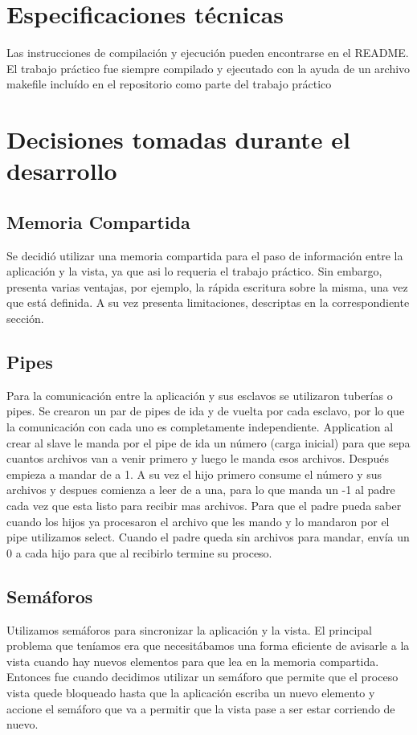 \documentclass[12pt]{article}
\begin{document}
\section{Especificaciones t\'ecnicas}

Las instrucciones de compilaci\'on y ejecuci\'on pueden encontrarse en el README. El trabajo pr\'actico fue siempre compilado y ejecutado con la ayuda de un archivo makefile inclu\'ido en el repositorio como parte del trabajo pr\'actico



\section{Decisiones tomadas durante el desarrollo}

\subsection{Memoria Compartida}
    Se decidi\'o utilizar una memoria compartida para el paso de informaci\'on entre la aplicaci\'on y la vista, ya que asi lo requeria el trabajo pr\'actico. Sin embargo, presenta varias ventajas, por ejemplo, la r\'apida escritura sobre la misma, una vez que est\'a definida. A su vez presenta limitaciones, descriptas en la correspondiente secci\'on. 

\subsection{Pipes}
	Para la comunicaci\'on entre la aplicaci\'on y sus esclavos se utilizaron tuber\'ias o pipes. Se crearon un par de pipes de ida y de vuelta por cada esclavo, por lo que la comunicaci\'on con cada uno es completamente independiente.
	Application al crear al slave le manda por el pipe de ida un n\'umero (carga inicial) para que sepa cuantos archivos van a venir primero y luego le manda esos archivos. Despu\'es empieza a mandar de a 1. A su vez el hijo primero consume el n\'umero y sus archivos y despues comienza a leer de a una, para lo que manda un -1 al padre cada vez que esta listo para recibir mas archivos.
	Para que el padre pueda saber cuando los hijos ya procesaron el archivo que les mando y lo mandaron por el pipe utilizamos select.
	Cuando el padre queda sin archivos para mandar, env\'ia un 0 a cada hijo para que al recibirlo termine su proceso.

\subsection{Sem\'aforos} 
    Utilizamos sem\'aforos para sincronizar la aplicaci\'on y la vista. El principal problema que ten\'iamos era que necesit\'abamos una forma eficiente de avisarle a la vista cuando hay nuevos elementos para que lea en la memoria compartida. Entonces fue cuando decidimos utilizar un sem\'aforo que permite que el proceso vista quede bloqueado hasta que la aplicaci\'on escriba un nuevo elemento y accione el sem\'aforo que va a permitir que la vista pase a ser estar corriendo de nuevo.
	
\end{document}
